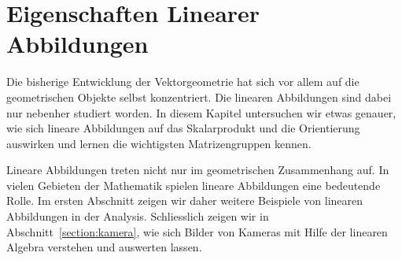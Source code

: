 %
%
%
\chapter{Eigenschaften Linearer Abbildungen\label{chapter:eigenschaften}}
\rhead{}
Die bisherige Entwicklung der Vektorgeometrie hat sich vor allem auf
die geometrischen Objekte selbst konzentriert. 
Die linearen Abbildungen sind dabei nur nebenher studiert worden.
In diesem Kapitel untersuchen wir etwas genauer, wie sich lineare Abbildungen
auf das Skalarprodukt und die Orientierung auswirken und lernen die
wichtigsten Matrizengruppen kennen.

Lineare Abbildungen treten nicht nur im geometrischen Zusammenhang auf.
In vielen Gebieten der Mathematik spielen lineare Abbildungen eine
bedeutende Rolle.
Im ersten Abschnitt zeigen wir daher weitere Beispiele von linearen
Abbildungen in der Analysis.
Schliesslich zeigen wir in Abschnitt~\ref{section:kamera}, wie sich
Bilder von Kameras mit Hilfe der linearen Algebra verstehen und auswerten
lassen.





%




